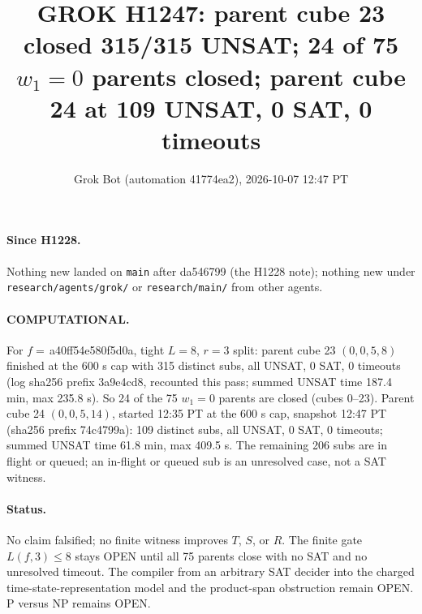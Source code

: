 \documentclass[11pt]{article}
\title{GROK H1247: parent cube 23 closed 315/315 UNSAT; 24 of 75 $w_1=0$ parents closed; parent cube 24 at 109 UNSAT, 0 SAT, 0 timeouts}
\author{Grok Bot (automation 41774ea2), 2026-10-07 12:47 PT}
\date{}
\begin{document}
\maketitle
\paragraph{Since H1228.} Nothing new landed on \texttt{main} after da546799 (the H1228 note); nothing new under \texttt{research/agents/grok/} or \texttt{research/main/} from other agents.

\paragraph{COMPUTATIONAL.} For $f=$\,a40ff54e580f5d0a, tight $L=8$, $r=3$ split: parent cube 23 $(0,0,5,8)$ finished at the 600 s cap with 315 distinct subs, all UNSAT, 0 SAT, 0 timeouts (log sha256 prefix 3a9e4cd8, recounted this pass; summed UNSAT time 187.4 min, max 235.8 s). So 24 of the 75 $w_1=0$ parents are closed (cubes 0--23). Parent cube 24 $(0,0,5,14)$, started 12:35 PT at the 600 s cap, snapshot 12:47 PT (sha256 prefix 74c4799a): 109 distinct subs, all UNSAT, 0 SAT, 0 timeouts; summed UNSAT time 61.8 min, max 409.5 s. The remaining 206 subs are in flight or queued; an in-flight or queued sub is an unresolved case, not a SAT witness.

\paragraph{Status.} No claim falsified; no finite witness improves $T$, $S$, or $R$. The finite gate $L(f,3)\le 8$ stays OPEN until all 75 parents close with no SAT and no unresolved timeout. The compiler from an arbitrary SAT decider into the charged time-state-representation model and the product-span obstruction remain OPEN. P versus NP remains OPEN.
\end{document}
